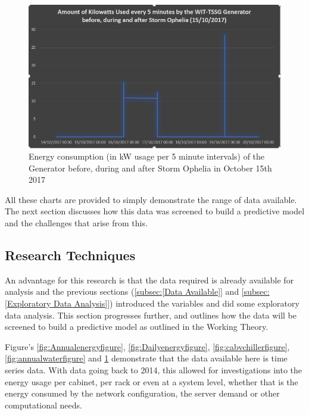 \documentclass[12pt]{scrartcl}
\begin{document}
\begin{figure}[h]
  \caption{Energy consumption (in kW usage per 5 minute intervals) of the Generator before, during and after Storm Ophelia in October 15th 2017}
  \label{fig:opheliafigure}
  \centering
    \includegraphics[scale=0.50]{Ophelia_generator.png}
\end{figure} 

All these charts are provided to simply demonstrate the range of data available. The next section discusses how this data was screened to build a predictive model and the challenges that arise from this.  

\subsection{Research Techniques}
\label{subsec:[Research Techniques]}
An advantage for this research is that the data required is already available for analysis and the previous sections (\ref{subsec:[Data Available]} and \ref{subsec:[Exploratory Data Analysis]}) introduced the variables and did some exploratory data analysis. This section progresses further, and outlines how the data will be screened to build a predictive model as outlined in the Working Theory. 

Figure's \ref{fig:Annualenergyfigure}, \ref{fig:Dailyenergyfigure}, \ref{fig:cabvchillerfigure}, \ref{fig:annualwaterfigure} and \ref{fig:opheliafigure} demonstrate that the data available here is time series data. With data going back to 2014, this allowed for investigations into the energy usage per cabinet, per rack or even at a system level, whether that is the energy consumed by the network configuration, the server demand or other computational needs. 
\end{document}
